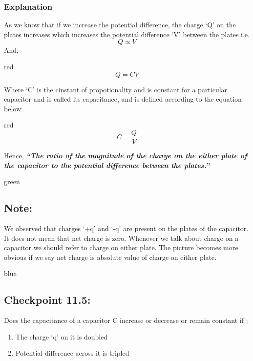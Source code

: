 \subsubsection*{Explanation}
As we know that if we increase the potential difference, the charge `Q' on
the plates increases
which increases the potential difference ‘V’ between the plates i.e.
\begin{equation}\nonumber
  Q \propto V
\end{equation}
And,
\begin{mybox}{red}{}
\begin{equation}\label{eq:11.68}
  Q =  CV
\end{equation}
\end{mybox}
Where `C' is the cinstant of propotionality and is constant for a
particular capacitor and is
called its capacitance, and is defined according to the equation below:
\begin{mybox}{red}{}
  \begin{equation}\label{eq:11.69}
    C =  \frac{Q}{V}
  \end{equation}
  \end{mybox}
Hence, \textit{\textbf{“The ratio of the magnitude of the charge on the either plate
of the capacitor to the potential difference between the plates.”}}
\begin{mybox}{green}{}
\subsection*{Note:}
We observed that charges ‘+q’ and ‘-q’ are present on the plates of the
capacitor. It does not mean that net charge is zero. Whenever we talk
about charge on a capacitor we should refer to charge on either plate.
The picture becomes more obvious if we say net charge is absolute value
of charge on either plate.
\end{mybox}
\begin{mybox}{blue}{}
  \subsection*{Checkpoint 11.5:}
  Does the capacitance of a capacitor C increase or decrease or remain
  constant if :
  \begin{enumerate}[label = (\alph*)]
  \item The charge `q' on it is doubled
  \item Potential difference across it is tripled
  \end{enumerate}
\end{mybox}

